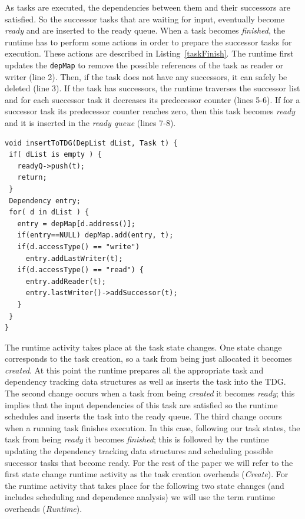 As tasks are executed, the dependencies between them and their successors are satisfied. 
So the successor tasks that are waiting for input, eventually become \textit{ready} and are inserted to the ready queue.
When a task becomes \textit{finished}, the runtime has to perform some actions in order to prepare the successor tasks for execution.
These actions are described in Listing~\ref{taskFinish}.
The runtime first updates the \texttt{depMap} to remove the possible references of the task as reader or writer (line 2).
Then, if the task does not have any successors, it can safely be deleted (line 3).
If the task has successors, the runtime traverses the successor list and for each successor task it decreases its predecessor counter (lines 5-6).
If for a successor task its predecessor counter reaches zero, then this task becomes \textit{ready} and it is inserted in the \textit{ready queue} (lines 7-8).
\begin{lstlisting}[float, emph={is, void,if,return,Dependency,DepList,Data,Task,not,for,true,and,break}, captionpos=b, caption={Pseudo-code for TDG insertion},label=insertTDG, emph={[2]mat}, emphstyle={[2]}, aboveskip={0\baselineskip}, frame=tb, belowskip={0\baselineskip}]
void insertToTDG(DepList dList, Task t) {
 if( dList is empty ) {
   readyQ->push(t);
   return;
 }
 Dependency entry;
 for( d in dList ) {
   entry = depMap[d.address()];
   if(entry==NULL) depMap.add(entry, t);
   if(d.accessType() == "write")
     entry.addLastWriter(t);
   if(d.accessType() == "read") {
     entry.addReader(t);
     entry.lastWriter()->addSuccessor(t);
   }
 }
}
\end{lstlisting}
The runtime activity takes place at the task state changes. 
One state change corresponds to the task creation, so a task from being just allocated it becomes \textit{created}. 
At this point the runtime prepares all the appropriate task and dependency tracking data structures as well as inserts the task into the TDG.
The second change occurs when a task from being \textit{created} it becomes \textit{ready};
this implies that the input dependencies of this task are satisfied so the runtime schedules and inserts the task into the ready queue.
The third change occurs when a running task finishes execution. 
In this case, following our task states, the task from being \textit{ready} it becomes \textit{finished}; this is followed by the runtime updating the dependency tracking data structures and scheduling possible successor tasks that become ready. 
For the rest of the paper we will refer to the first state change runtime activity as the task creation overheads (\textit{Create}).
For the runtime activity that takes place for the following two state changes (and includes scheduling and dependence analysis) we will use the term runtime overheads (\textit{Runtime}).



